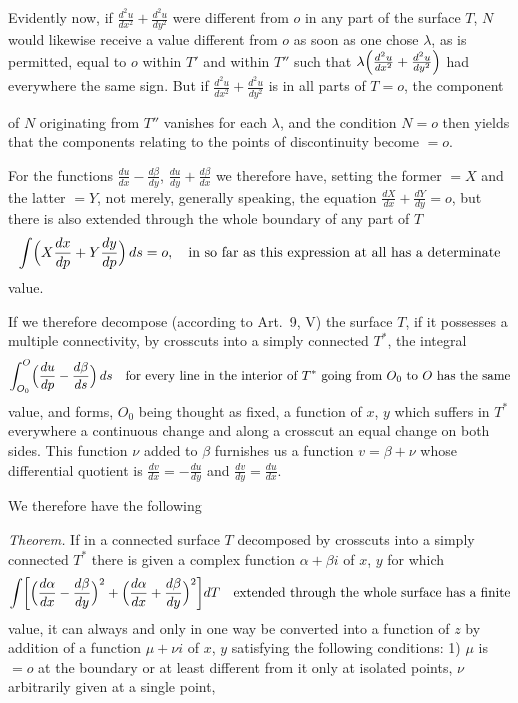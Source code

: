 \documentclass{article}
\begin{document}
Evidently now, if $\frac{d^2u}{dx^2} + \frac{d^2u}{dy^2}$ were different from $o$ in any part of the surface $T$, $N$ would likewise receive a value different from $o$ as soon as one chose $\lambda$, as is permitted, equal to $o$ within $T'$ and within $T''$ such that $\lambda \Bigl(\frac{d^2u}{dx^2} + \frac{d^2u}{dy^2}\Bigr)$ had everywhere the same sign. But if $\frac{d^2u}{dx^2} + \frac{d^2u}{dy^2}$ is in all parts of $T = o$, the component

of $N$ originating from $T''$ vanishes for each $\lambda$, and the condition $N = o$ then yields that the components relating to the points of discontinuity become $= o$.

For the functions $\frac{du}{dx} - \frac{d\beta}{dy}$, $\frac{du}{dy} + \frac{d\beta}{dx}$ we therefore have, setting the former $= X$ and the latter $= Y$, not merely, generally speaking, the equation $\frac{dX}{dx} + \frac{dY}{dy} = o$, but there is also extended through the whole boundary of any part of $T$
\[
\int \Bigl(X\frac{dx}{dp} + Y\frac{dy}{dp}\Bigr)\,ds = o, \quad \text{in so far as this expression at all has a determinate}
\]
value.

If we therefore decompose (according to Art.~9, V) the surface $T$, if it possesses a multiple connectivity, by crosscuts into a simply connected $T^*$, the integral
\[
\int_{O_0}^O \Bigl(\frac{du}{dp} - \frac{d\beta}{ds}\Bigr)\,ds \quad \text{for every line in the interior of } T^* \text{ going from } O_0 \text{ to } O \text{ has the same}
\]
value, and forms, $O_0$ being thought as fixed, a function of $x$, $y$ which suffers in $T^*$ everywhere a continuous change and along a crosscut an equal change on both sides. This function $\nu$ added to $\beta$ furnishes us a function $v = \beta + \nu$ whose differential quotient is $\frac{dv}{dx} = -\frac{du}{dy}$ and $\frac{dv}{dy} = \frac{du}{dx}$.

We therefore have the following

\emph{Theorem.} If in a connected surface $T$ decomposed by crosscuts into a simply connected $T^*$ there is given a complex function $\alpha + \beta i$ of $x$, $y$ for which
\[
\int \biggl[\Bigl(\frac{d\alpha}{dx} - \frac{d\beta}{dy}\Bigr)^2 + \Bigl(\frac{d\alpha}{dx} + \frac{d\beta}{dy}\Bigr)^2\biggr] dT \quad \text{extended through the whole surface has a finite}
\]
value, it can always and only in one way be converted into a function of $z$ by addition of a function $\mu + \nu i$ of $x$, $y$ satisfying the following conditions:
1) $\mu$ is $= o$ at the boundary or at least different from it only at isolated points, $\nu$ arbitrarily given at a single point,
\end{document}
